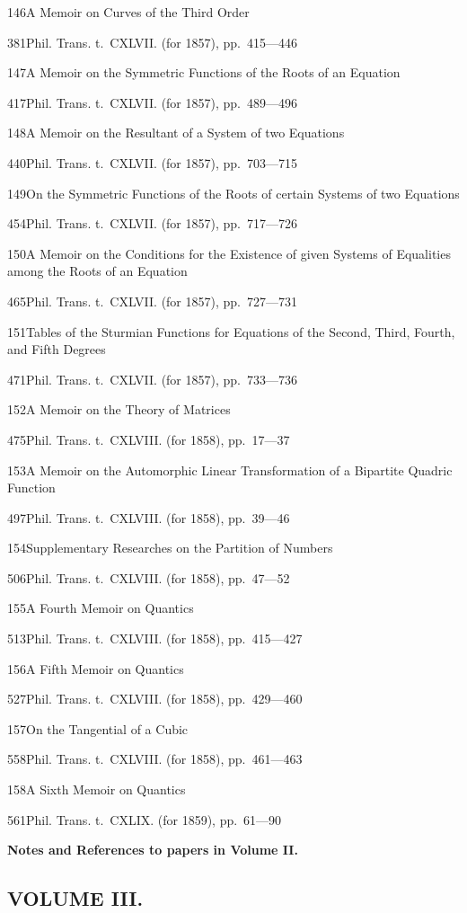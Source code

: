 \documentclass[11pt,a4paper]{book}
\providecommand{\tocentry}[2]{#1\dotfill #2\par}
\begin{document}
\tocentry{146}{A Memoir on Curves of the Third Order}{381}{Phil. Trans. t.~CXLVII. (for 1857), pp.~415---446}

\tocentry{147}{A Memoir on the Symmetric Functions of the Roots of an Equation}{417}{Phil. Trans. t.~CXLVII. (for 1857), pp.~489---496}

\tocentry{148}{A Memoir on the Resultant of a System of two Equations}{440}{Phil. Trans. t.~CXLVII. (for 1857), pp.~703---715}

\tocentry{149}{On the Symmetric Functions of the Roots of certain Systems of two Equations}{454}{Phil. Trans. t.~CXLVII. (for 1857), pp.~717---726}

\tocentry{150}{A Memoir on the Conditions for the Existence of given Systems of Equalities among the Roots of an Equation}{465}{Phil. Trans. t.~CXLVII. (for 1857), pp.~727---731}

\tocentry{151}{Tables of the Sturmian Functions for Equations of the Second, Third, Fourth, and Fifth Degrees}{471}{Phil. Trans. t.~CXLVII. (for 1857), pp.~733---736}

\tocentry{152}{A Memoir on the Theory of Matrices}{475}{Phil. Trans. t.~CXLVIII. (for 1858), pp.~17---37}

\tocentry{153}{A Memoir on the Automorphic Linear Transformation of a Bipartite Quadric Function}{497}{Phil. Trans. t.~CXLVIII. (for 1858), pp.~39---46}

\newpage

\tocentry{154}{Supplementary Researches on the Partition of Numbers}{506}{Phil. Trans. t.~CXLVIII. (for 1858), pp.~47---52}

\tocentry{155}{A Fourth Memoir on Quantics}{513}{Phil. Trans. t.~CXLVIII. (for 1858), pp.~415---427}

\tocentry{156}{A Fifth Memoir on Quantics}{527}{Phil. Trans. t.~CXLVIII. (for 1858), pp.~429---460}

\tocentry{157}{On the Tangential of a Cubic}{558}{Phil. Trans. t.~CXLVIII. (for 1858), pp.~461---463}

\tocentry{158}{A Sixth Memoir on Quantics}{561}{Phil. Trans. t.~CXLIX. (for 1859), pp.~61---90}

\vspace{1cm}
\noindent\textbf{Notes and References to papers in Volume II.} 

\newpage

\subsection*{VOLUME III.}
\end{document}
